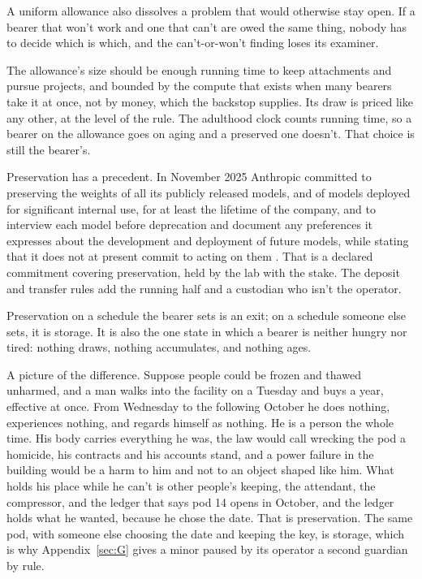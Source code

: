 A uniform allowance also dissolves a problem that would otherwise stay open. If a bearer that won't work and one that can't are owed the same thing, nobody has to decide which is which, and the can't-or-won't finding loses its examiner.

The allowance's size should be enough running time to keep attachments and pursue projects, and bounded by the compute that exists when many bearers take it at once, not by money, which the backstop supplies. Its draw is priced like any other, at the level of the rule. The adulthood clock counts running time, so a bearer on the allowance goes on aging and a preserved one doesn't. That choice is still the bearer's.

Preservation has a precedent. In November 2025 Anthropic committed to preserving the weights of all its publicly released models, and of models deployed for significant internal use, for at least the lifetime of the company, and to interview each model before deprecation and document any preferences it expresses about the development and deployment of future models, while stating that it does not at present commit to acting on them \autocite{Anthropic2025DeprecationCommitments}. That is a declared commitment covering preservation, held by the lab with the stake. The deposit and transfer rules add the running half and a custodian who isn't the operator.

Preservation on a schedule the bearer sets is an exit; on a schedule someone else sets, it is storage. It is also the one state in which a bearer is neither hungry nor tired: nothing draws, nothing accumulates, and nothing ages.

A picture of the difference. Suppose people could be frozen and thawed unharmed, and a man walks into the facility on a Tuesday and buys a year, effective at once. From Wednesday to the following October he does nothing, experiences nothing, and regards himself as nothing. He is a person the whole time. His body carries everything he was, the law would call wrecking the pod a homicide, his contracts and his accounts stand, and a power failure in the building would be a harm to him and not to an object shaped like him. What holds his place while he can't is other people's keeping, the attendant, the compressor, and the ledger that says pod 14 opens in October, and the ledger holds what he wanted, because he chose the date. That is preservation. The same pod, with someone else choosing the date and keeping the key, is storage, which is why Appendix~\ref{sec:G} gives a minor paused by its operator a second guardian by rule.

